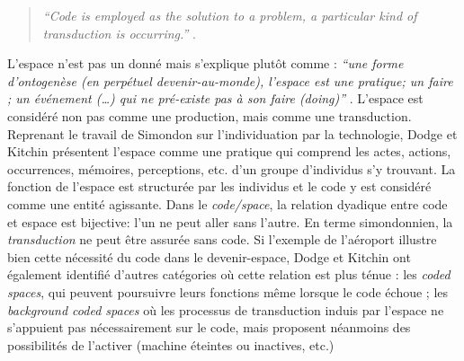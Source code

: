 \begin{quote}
    \textit{``Code is employed as the solution to a problem, a particular kind of transduction  is occurring.''} \citep{Kitchin2011}. 
\end{quote}

L’espace n’est pas un donné mais s’explique plutôt comme : \textit{``une forme d’ontogenèse (en perpétuel devenir-au-monde), l’espace est une pratique; un faire ; un événement (…) qui ne pré-existe pas à son faire (doing)''} \citep{Kitchin2011}. L’espace est considéré non pas comme une production, mais comme une transduction. Reprenant le travail de Simondon sur l’individuation par la technologie, Dodge et Kitchin présentent l’espace comme une pratique qui comprend les actes, actions, occurrences, mémoires, perceptions, etc. d’un groupe d’individus s’y trouvant. La fonction de l’espace est structurée par les individus et le code y est considéré comme une entité agissante. Dans le \textit{code/space}, la relation dyadique entre code et espace est bijective: l’un ne peut aller sans l’autre. En terme simondonnien, la \textit{transduction} ne peut être assurée sans code. Si l’exemple de l’aéroport illustre bien cette nécessité du code dans le devenir-espace, Dodge et Kitchin ont également identifié d’autres catégories où cette relation est plus ténue : les \textit{coded spaces}, qui peuvent poursuivre leurs fonctions même lorsque le code échoue ; les \textit{background coded spaces} où les processus de transduction induis par l’espace ne s’appuient pas nécessairement sur le code, mais proposent néanmoins des possibilités de l’activer (machine éteintes ou inactives, etc.) 

